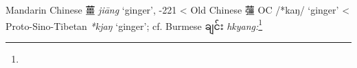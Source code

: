 \begin{etymology}\label{ety:jiang}
Mandarin Chinese {薑} \textit{jiāng} `ginger', -221
< Old Chinese {䕬} \gls{OC} /*kaŋ/ `ginger'
< Proto-Sino-Tibetan \textit{*kjaŋ} `ginger'; cf. Burmese ချင်း \textit{hkyang:}\footnote{}
\end{etymology}